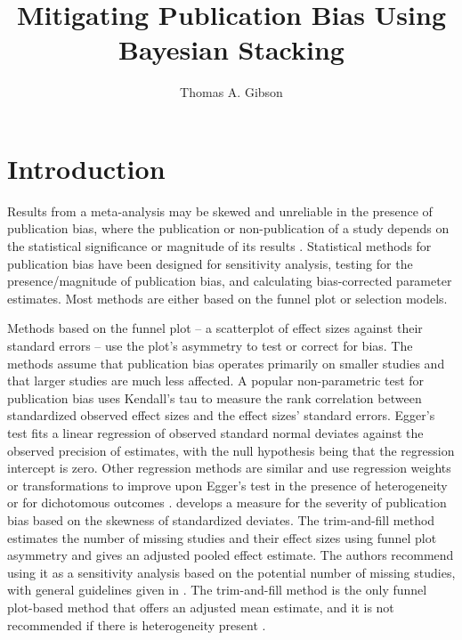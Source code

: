 \documentclass[12pt]{article}   	%
\title{Mitigating Publication Bias Using Bayesian Stacking}
\author{Thomas A. Gibson}
\numberwithin{equation}{section}
\begin{document}
\maketitle

\doublespacing
\nomarkersintext

\section{Introduction} \label{sec:intro}

Results from a meta-analysis may be skewed and unreliable in the presence of publication bias, where the publication or non-publication of a study depends on the statistical significance or magnitude of its results \citep{rothstein2006}. Statistical methods for publication bias have been designed for sensitivity analysis, testing for the presence/magnitude of publication bias, and calculating bias-corrected parameter estimates. Most methods are either based on the funnel plot or selection models.

Methods based on the funnel plot \citep{light1984funnel} -- a scatterplot of effect sizes against their standard errors -- use the plot's asymmetry to test or correct for bias. The methods assume that publication bias operates primarily on smaller studies and that larger studies are much less affected. A popular non-parametric test for publication bias \citep{begg1994test} uses Kendall's tau to measure the rank correlation between standardized observed effect sizes and the effect sizes' standard errors. Egger's test \citep{egger1997test} fits a linear regression of observed standard normal deviates against the observed precision of estimates, with the null hypothesis being that the regression intercept is zero. Other regression methods \citep{macaskill2001test, rucker2008arcsine, thompson1999test, peters2006test} are similar and use regression weights or transformations to improve upon Egger's test in the presence of heterogeneity or for dichotomous outcomes \citep{jin2015methods}. \citet{lin2018test} develops a measure for the severity of publication bias based on the skewness of standardized deviates. The trim-and-fill method \citep{duval2000biom} estimates the number of missing studies and their effect sizes using funnel plot asymmetry and gives an adjusted pooled effect estimate. The authors recommend using it as a sensitivity analysis based on the potential number of missing studies, with general guidelines given in \citet{shi2019trim}. The trim-and-fill method is the only funnel plot-based method that offers an adjusted mean estimate, and it is not recommended if there is heterogeneity present \citep{jin2015methods}.
\end{document}

